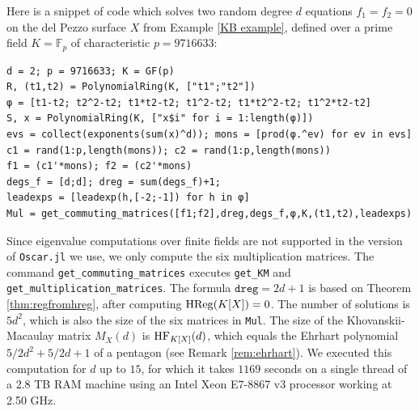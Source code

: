 \documentclass[12pt]{article}
\theoremstyle{definition}
\newenvironment{example}
  {\pushQED{\qed}\renewcommand{\qedsymbol}{$\diamond$}\examplex}
  {\popQED\endexamplex}
\theoremstyle{remark}
\begin{document}
\begin{example}[Equations on a del Pezzo surface] \label{ex:delpezzocomp}
Here is a snippet of code which solves two random degree $d$ equations $f_1 = f_2 = 0$ on the del Pezzo surface $X$ from Example \ref{KB example}, defined over a prime field $K = \mathbb{F}_p$ of characteristic $p = 9716633$:
\begin{verbatim}
d = 2; p = 9716633; K = GF(p)
R, (t1,t2) = PolynomialRing(K, ["t1";"t2"])
φ = [t1-t2; t2^2-t2; t1*t2-t2; t1^2-t2; t1*t2^2-t2; t1^2*t2-t2]
S, x = PolynomialRing(K, ["x$i" for i = 1:length(φ)])
evs = collect(exponents(sum(x)^d)); mons = [prod(φ.^ev) for ev in evs]
c1 = rand(1:p,length(mons)); c2 = rand(1:p,length(mons))
f1 = (c1'*mons); f2 = (c2'*mons)
degs_f = [d;d]; dreg = sum(degs_f)+1; 
leadexps = [leadexp(h,[-2;-1]) for h in φ]
Mul = get_commuting_matrices([f1;f2],dreg,degs_f,φ,K,(t1,t2),leadexps)
\end{verbatim}
Since eigenvalue computations over finite fields are not supported in the version of \texttt{Oscar.jl} we use, we only compute the six multiplication matrices. The command \texttt{get\_commuting\_matrices} executes \texttt{get\_KM} and \texttt{get\_multiplication\_matrices}. The formula $\mathtt{dreg} = 2d+1$ is based on Theorem \ref{thm:regfromhreg}, after computing ${\rm HReg}(K[X]) = 0$. The number of solutions is $5d^2$, which is also the size of the six matrices in \texttt{Mul}. The size of the Khovanskii-Macaulay matrix $M_X(d)$ is ${\rm HF}_{K[X]}(d)$, which equals the Ehrhart polynomial $5/2d^2 + 5/2d + 1$ of a pentagon (see Remark \ref{rem:ehrhart}). We executed this computation for $d$ up to $15$, for which it takes $1169$ seconds on a single thread of a 2.8 TB RAM machine using an Intel Xeon E7-8867 v3 processor working at 2.50 GHz.
\end{example}
\end{document}
